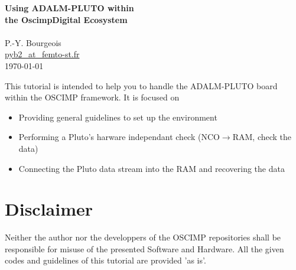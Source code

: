 \documentclass{article}
\begin{document}
\begin{center}
{\bf \Large Using ADALM-PLUTO within \\ the OscimpDigital Ecosystem} \\ \ \\
P.-Y. Bourgeois \\ \href{mailto:pyb2@femto-st.fr}{pyb2\_at\_femto-st.fr}\ \\ \today
\end{center}


This tutorial is intended to help you to handle the ADALM-PLUTO board within the
OSCIMP framework.
It is focused on

\begin{itemize}
	\item Providing general guidelines to set up the environment
	\item Performing a Pluto's harware independant check (NCO$\to$RAM, check the data)
	\item Connecting the Pluto data stream into the RAM and recovering the data
\end{itemize}

\begin{figure}[h!]
\end{figure}


\section*{Disclaimer}
Neither the author nor the developpers of the OSCIMP repositories shall be
responsible for misuse of the presented Software and Hardware.
All the given codes and guidelines of this tutorial are provided 'as is'.
\end{document}
